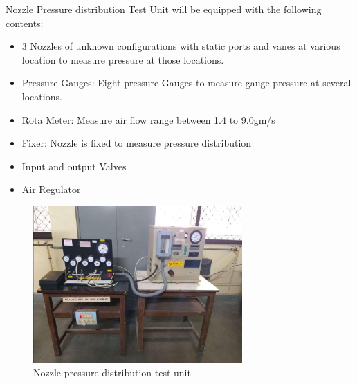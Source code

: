 Nozzle Pressure distribution Test Unit will be equipped with the following contents:
\begin{itemize}
    \item 3 Nozzles of unknown configurations with static ports and vanes at
various location to measure pressure at those locations.
    \item Pressure Gauges: Eight pressure Gauges to measure gauge pressure at
several locations.
    \item Rota Meter: Measure air flow range between 1.4 to 9.0gm/s
    \item Fixer: Nozzle is fixed to measure pressure distribution
    \item Input and output Valves
    \item Air Regulator
\end{itemize}

\begin{figure}
    \centering
    \includegraphics[width=8cm]{setupImg.jpg}
    \caption{Nozzle pressure distribution test unit}
\end{figure}
